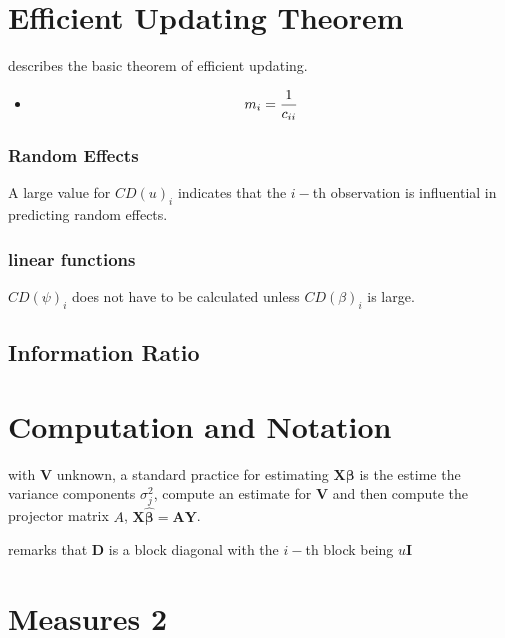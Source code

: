 \documentclass[12pt, a4paper]{article}
\begin{document}

\section{Efficient Updating Theorem} %
\citet{Zewotir} describes the basic theorem of efficient updating.
\begin{itemize}
	\item \[ m_i = {1 \over c_{ii}}\]
\end{itemize}

\newpage
\subsubsection{Random Effects}

A large value for $CD(u)_i$ indicates that the $i-$th observation is influential in predicting random effects.

\subsubsection{linear functions}

$CD(\psi)_i$ does not have to be calculated unless $CD(\beta)_i$ is large.


\subsection{Information Ratio}


\newpage
\section{Computation and Notation } %
with $\boldsymbol{V}$ unknown, a standard practice for estimating $\boldsymbol{X \beta}$ is the estime the variance components $\sigma^2_j$,
compute an estimate for $\boldsymbol{V}$ and then compute the projector matrix $A$, $\boldsymbol{X \hat{\beta}}  = \boldsymbol{AY}$.


\citet{Zewotir} remarks that $\boldsymbol{D}$ is a block diagonal with the $i-$th block being $u \boldsymbol{I}$
\newpage
\section{Measures 2} %
\end{document}
